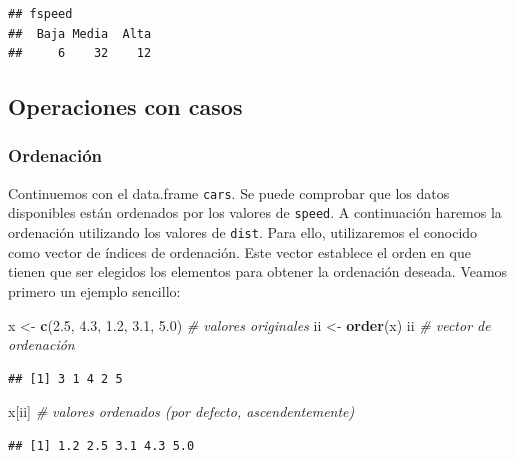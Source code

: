 \documentclass[
]{book}
\newenvironment{Shaded}{\begin{snugshade}}{\end{snugshade}}
\newcommand{\CommentTok}[1]{\textcolor[rgb]{0.56,0.35,0.01}{\textit{#1}}}
\newcommand{\FloatTok}[1]{\textcolor[rgb]{0.00,0.00,0.81}{#1}}
\newcommand{\FunctionTok}[1]{\textcolor[rgb]{0.13,0.29,0.53}{\textbf{#1}}}
\newcommand{\NormalTok}[1]{#1}
\newcommand{\OtherTok}[1]{\textcolor[rgb]{0.56,0.35,0.01}{#1}}
\begin{document}
\begin{verbatim}
## fspeed
##  Baja Media  Alta 
##     6    32    12
\end{verbatim}

\hypertarget{operaciones-con-casos}{%
\subsection{Operaciones con casos}\label{operaciones-con-casos}}

\hypertarget{ordenaciuxf3n}{%
\subsubsection{Ordenación}\label{ordenaciuxf3n}}

Continuemos con el data.frame \texttt{cars}.
Se puede comprobar que los datos disponibles están ordenados por
los valores de \texttt{speed}. A continuación haremos la ordenación utilizando
los valores de \texttt{dist}. Para ello, utilizaremos el conocido como vector de
índices de ordenación.
Este vector establece el orden en que tienen que ser elegidos los
elementos para obtener la ordenación deseada.
Veamos primero un ejemplo sencillo:

\begin{Shaded}
\begin{Highlighting}[]
\NormalTok{x }\OtherTok{\textless{}{-}} \FunctionTok{c}\NormalTok{(}\FloatTok{2.5}\NormalTok{, }\FloatTok{4.3}\NormalTok{, }\FloatTok{1.2}\NormalTok{, }\FloatTok{3.1}\NormalTok{, }\FloatTok{5.0}\NormalTok{) }\CommentTok{\# valores originales}
\NormalTok{ii }\OtherTok{\textless{}{-}} \FunctionTok{order}\NormalTok{(x)}
\NormalTok{ii    }\CommentTok{\# vector de ordenación}
\end{Highlighting}
\end{Shaded}

\begin{verbatim}
## [1] 3 1 4 2 5
\end{verbatim}

\begin{Shaded}
\begin{Highlighting}[]
\NormalTok{x[ii] }\CommentTok{\# valores ordenados (por defecto, ascendentemente)}
\end{Highlighting}
\end{Shaded}

\begin{verbatim}
## [1] 1.2 2.5 3.1 4.3 5.0
\end{verbatim}
\end{document}
